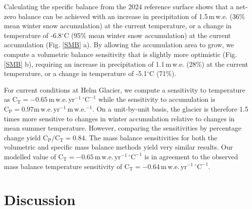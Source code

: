\documentclass[annals,review,oneside]{igs}
\begin{document}
Calculating the specific balance from the 2024 reference surface shows that a net-zero balance can be achieved with an increase in precipitation of 1.5\,m\,w.e. (36\% mean winter snow accumulation) at the current temperature, or a change in temperature of -6.8$^\circ$C (95\% mean winter snow accumulation) at the current accumulation (Fig. \ref{SMB} a). By allowing the accumulation area to grow, we compute a volumetric balance sensitivity that is slightly more optimistic (Fig. \ref{SMB} b), requiring an increase in precipitation of 1.1\,m\,w.e. (28\%) at the current temperature, or a change in temperature of -5.1$^\circ$C (71\%). 

For current conditions at Helm Glacier, we compute a sensitivity to temperature as $\mathrm{C_T = -0.65\,m\,w.e.\,yr^{-1}\,^\circ C^{-1}}$ while the sensitivity to accumulation is $\mathrm{C_P = 0.97 m\,w.e.\,yr^{-1}\,m\,w.e.^{-1}}$. On a unit-by-unit basis, the glacier is therefore 1.5 times more sensitive to changes in winter accumulation relative to changes in mean summer temperature. However, comparing the sensitivities by percentage change yield $\mathrm{C_P/C_T}=0.84$. The mass balance sensitivities for both the volumetric and specific mass balance methods yield very similar results. Our modelled value of $\mathrm{C_T = -0.65\,m\,w.e.\,yr^{-1}\,^\circ C^{-1}}$ is in agreement to the observed mass balance temperature sensitivity of $\mathrm{C_T = -0.64\,m\,w.e.\,yr^{-1}\,^\circ C^{-1}}$. 

\section{Discussion}
\end{document}
